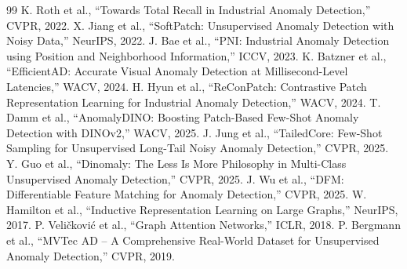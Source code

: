 \documentclass[a4paper,11pt]{ltjsarticle}
\begin{document}
\begin{thebibliography}{99}
 K. Roth et al., ``Towards Total Recall in Industrial Anomaly Detection,'' CVPR, 2022.
 X. Jiang et al., ``SoftPatch: Unsupervised Anomaly Detection with Noisy Data,'' NeurIPS, 2022.
 J. Bae et al., ``PNI: Industrial Anomaly Detection using Position and Neighborhood Information,'' ICCV, 2023.
 K. Batzner et al., ``EfficientAD: Accurate Visual Anomaly Detection at Millisecond-Level Latencies,'' WACV, 2024.
 H. Hyun et al., ``ReConPatch: Contrastive Patch Representation Learning for Industrial Anomaly Detection,'' WACV, 2024.
 T. Damm et al., ``AnomalyDINO: Boosting Patch-Based Few-Shot Anomaly Detection with DINOv2,'' WACV, 2025.
 J. Jung et al., ``TailedCore: Few-Shot Sampling for Unsupervised Long-Tail Noisy Anomaly Detection,'' CVPR, 2025.
 Y. Guo et al., ``Dinomaly: The Less Is More Philosophy in Multi-Class Unsupervised Anomaly Detection,'' CVPR, 2025.
 J. Wu et al., ``DFM: Differentiable Feature Matching for Anomaly Detection,'' CVPR, 2025.
 W. Hamilton et al., ``Inductive Representation Learning on Large Graphs,'' NeurIPS, 2017.
 P. Veli\v{c}kovi\'c et al., ``Graph Attention Networks,'' ICLR, 2018.
 P. Bergmann et al., ``MVTec AD -- A Comprehensive Real-World Dataset for Unsupervised Anomaly Detection,'' CVPR, 2019.
\end{thebibliography}
\end{document}
